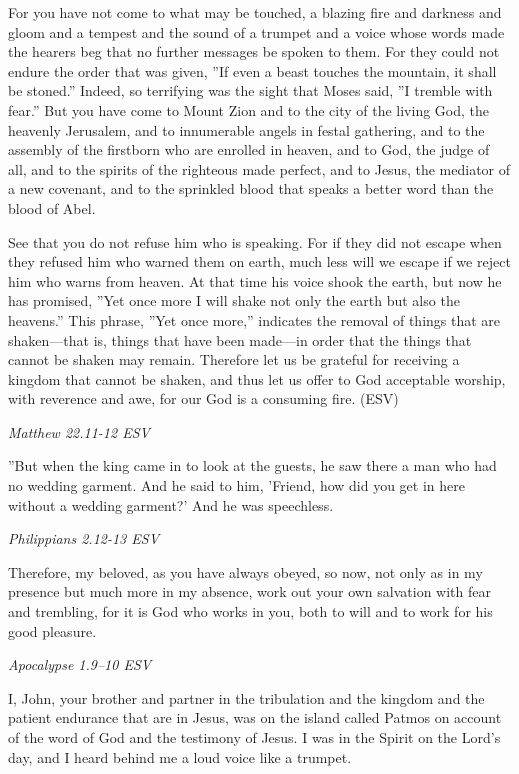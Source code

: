 \documentclass[
]{article}
\newcommand{\RL}[1]{\beginR #1\endR}
\begin{document}
For you have not come to what may be touched, a blazing fire and
darkness and gloom and a tempest and the sound of a trumpet and a voice
whose words made the hearers beg that no further messages be spoken to
them. For they could not endure the order that was given, \RL{''}If even
a beast touches the mountain, it shall be stoned.'' Indeed, so
terrifying was the sight that Moses said, \RL{''}I tremble with fear.''
But you have come to Mount Zion and to the city of the living God, the
heavenly Jerusalem, and to innumerable angels in festal gathering, and
to the assembly of the firstborn who are enrolled in heaven, and to God,
the judge of all, and to the spirits of the righteous made perfect, and
to Jesus, the mediator of a new covenant, and to the sprinkled blood
that speaks a better word than the blood of Abel.

See that you do not refuse him who is speaking. For if they did not
escape when they refused him who warned them on earth, much less will we
escape if we reject him who warns from heaven. At that time his voice
shook the earth, but now he has promised, \RL{''}Yet once more I will
shake not only the earth but also the heavens.'' This phrase, \RL{''}Yet
once more,'' indicates the removal of things that are shaken---that is,
things that have been made---in order that the things that cannot be
shaken may remain. Therefore let us be grateful for receiving a kingdom
that cannot be shaken, and thus let us offer to God acceptable worship,
with reverence and awe, for our God is a consuming fire. (ESV)

\emph{Matthew 22.11-12 ESV}

\RL{''}But when the king came in to look at the guests, he saw there a
man who had no wedding garment. And he said to him, \RL{'}Friend, how
did you get in here without a wedding garment?\RL{'} And he was
speechless.

\emph{Philippians 2.12-13 ESV}

Therefore, my beloved, as you have always obeyed, so now, not only as in
my presence but much more in my absence, work out your own salvation
with fear and trembling, for it is God who works in you, both to will
and to work for his good pleasure.

\emph{Apocalypse 1.9--10 ESV}

I, John, your brother and partner in the tribulation and the kingdom and
the patient endurance that are in Jesus, was on the island called Patmos
on account of the word of God and the testimony of Jesus. I was in the
Spirit on the Lord\RL{'}s day, and I heard behind me a loud voice like a
trumpet.
\end{document}
